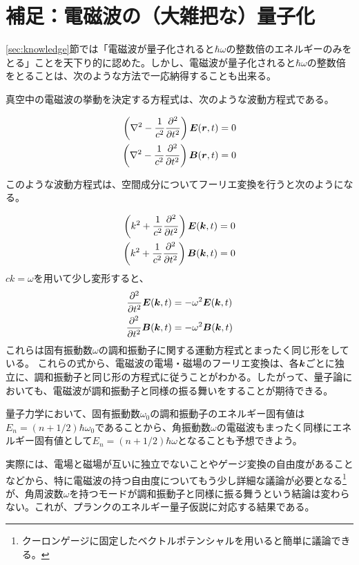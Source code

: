 \documentclass[uplatex,dvipdfmx]{jsarticle}
\begin{document}
\section{補足：電磁波の（大雑把な）量子化}
\ref{sec:knowledge}節では「電磁波が量子化されると$\hbar \omega$の整数倍のエネルギーのみをとる」ことを天下り的に認めた。しかし、電磁波が量子化されると$\hbar \omega$の整数倍をとることは、次のような方法で一応納得することも出来る。

真空中の電磁波の挙動を決定する方程式は、次のような波動方程式である。

\begin{align}
    \left(\nabla^2 - \frac{1}{c^2}\pdv[2]{}{t}\right) \vb*{E}(\vb*{r},t) &= 0 \\
    \left(\nabla^2 - \frac{1}{c^2}\pdv[2]{}{t}\right) \vb*{B}(\vb*{r},t) &= 0    
\end{align}

このような波動方程式は、空間成分についてフーリエ変換を行うと次のようになる。

\begin{align}
    \left(k^2 + \frac{1}{c^2}\pdv[2]{}{t}\right) \vb*{E}(\vb*{k},t) &= 0 \\
    \left(k^2 + \frac{1}{c^2}\pdv[2]{}{t}\right) \vb*{B}(\vb*{k},t) &= 0
\end{align}
$ck = \omega$を用いて少し変形すると、
\begin{align}
    \pdv[2]{}{t} \vb*{E}(\vb*{k},t) &= -\omega^2 \vb*{E}(\vb*{k},t) \\
    \pdv[2]{}{t} \vb*{B}(\vb*{k},t) &= -\omega^2 \vb*{B}(\vb*{k},t) \\
\end{align}
これらは固有振動数$\omega$の調和振動子に関する運動方程式とまったく同じ形をしている。
これらの式から、電磁波の電場・磁場のフーリエ変換は、各$\vb*{k}$ごとに独立に、調和振動子と同じ形の方程式に従うことがわかる。したがって、量子論においても、電磁波が調和振動子と同様の振る舞いをすることが期待できる。

量子力学において、固有振動数$\omega_0$の調和振動子のエネルギー固有値は$E_n = (n+1/2)\hbar\omega_0$であることから、角振動数$\omega$の電磁波もまったく同様にエネルギー固有値として$E_n = (n+1/2)\hbar\omega$となることも予想できよう。

\vspace{0.5cm}

実際には、電場と磁場が互いに独立でないことやゲージ変換の自由度があることなどから、特に電磁波の持つ自由度についてもう少し詳細な議論が必要となる\footnote{クーロンゲージに固定したベクトルポテンシャルを用いると簡単に議論できる。}が、角周波数$\omega$を持つモードが調和振動子と同様に振る舞うという結論は変わらない。これが、プランクのエネルギー量子仮説に対応する結果である。
\end{document}
